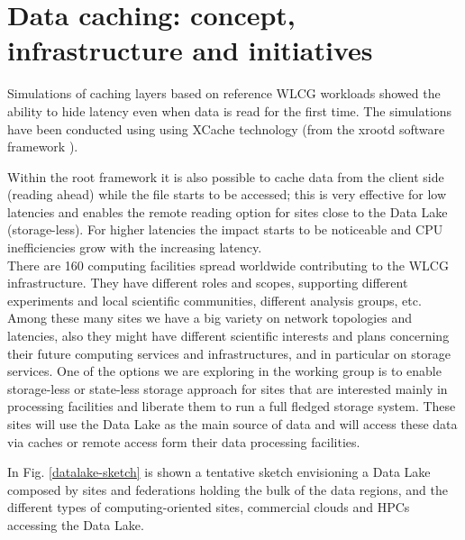 \section{Data caching: concept, infrastructure and initiatives}
Simulations of caching layers based on reference WLCG workloads showed the ability to hide latency 
even when data is read for the first time. The simulations have been conducted using using XCache technology (from the xrootd software framework \cite{xroot}).

Within the root framework \cite{root} it is also possible to cache data from the client side (reading ahead) while the file starts to be accessed; this is very effective for low latencies and enables the remote reading option for sites close to the Data Lake (storage-less). For higher latencies the impact starts to be noticeable and CPU inefficiencies grow with the increasing latency.\\
There are 160 computing facilities spread worldwide contributing to the WLCG infrastructure. They have different roles and scopes, supporting different experiments and local scientific communities, different analysis groups, etc. Among these many sites we have a big variety on network topologies and latencies, also they might have different scientific interests and plans concerning their future computing services and infrastructures, and in particular on storage services. One of the options we are exploring in the working group is to enable storage-less or state-less storage approach for sites that are interested mainly in processing facilities and liberate them to run a full fledged storage system. These sites will use the Data Lake as the main source of data and will access these data via caches or remote access form their data processing facilities.

In Fig. \ref{datalake-sketch} is shown a tentative 
sketch envisioning a Data Lake composed by sites and federations holding the bulk of the data regions, and 
the different types of computing-oriented sites, commercial clouds and HPCs accessing the Data Lake.\\

